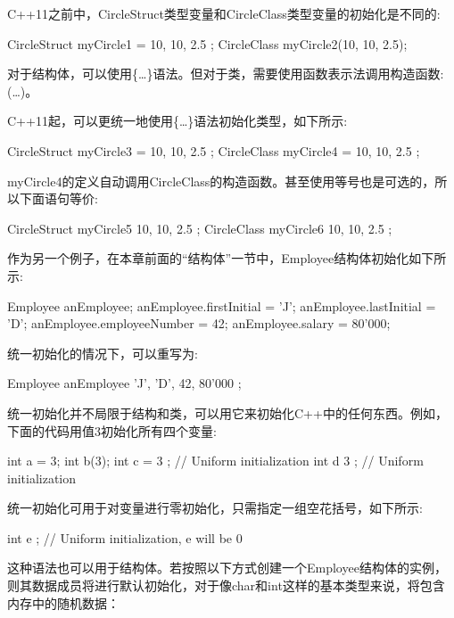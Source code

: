 C++11之前中，CircleStruct类型变量和CircleClass类型变量的初始化是不同的:

\begin{cpp}
CircleStruct myCircle1 = { 10, 10, 2.5 };
CircleClass myCircle2(10, 10, 2.5);
\end{cpp}

对于结构体，可以使用\{…\}语法。但对于类，需要使用函数表示法调用构造函数:(…)。

C++11起，可以更统一地使用\{…\}语法初始化类型，如下所示:

\begin{cpp}
CircleStruct myCircle3 = { 10, 10, 2.5 };
CircleClass myCircle4 = { 10, 10, 2.5 };
\end{cpp}

myCircle4的定义自动调用CircleClass的构造函数。甚至使用等号也是可选的，所以下面语句等价:

\begin{cpp}
CircleStruct myCircle5 { 10, 10, 2.5 };
CircleClass myCircle6 { 10, 10, 2.5 };
\end{cpp}

作为另一个例子，在本章前面的“结构体”一节中，Employee结构体初始化如下所示:

\begin{cpp}
Employee anEmployee;
anEmployee.firstInitial = 'J';
anEmployee.lastInitial = 'D';
anEmployee.employeeNumber = 42;
anEmployee.salary = 80'000;
\end{cpp}

统一初始化的情况下，可以重写为:

\begin{cpp}
Employee anEmployee { 'J', 'D', 42, 80'000 };
\end{cpp}

统一初始化并不局限于结构和类，可以用它来初始化C++中的任何东西。例如，下面的代码用值3初始化所有四个变量:

\begin{cpp}
int a = 3;
int b(3);
int c = { 3 }; // Uniform initialization
int d { 3 }; // Uniform initialization
\end{cpp}

统一初始化可用于对变量进行零初始化，只需指定一组空花括号，如下所示:

\begin{cpp}
int e { }; // Uniform initialization, e will be 0
\end{cpp}

这种语法也可以用于结构体。若按照以下方式创建一个Employee结构体的实例，则其数据成员将进行默认初始化，对于像char和int这样的基本类型来说，将包含内存中的随机数据：

